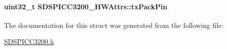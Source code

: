\paragraph[{tx\+Pack\+Pin}]{\setlength{\rightskip}{0pt plus 5cm}uint32\+\_\+t S\+D\+S\+P\+I\+C\+C3200\+\_\+\+H\+W\+Attrs\+::tx\+Pack\+Pin}\label{struct_s_d_s_p_i_c_c3200___h_w_attrs_ac74ef997109f15ab77d18fac98bbf939}


The documentation for this struct was generated from the following file\+:\begin{DoxyCompactItemize}
\item 
\hyperlink{_s_d_s_p_i_c_c3200_8h}{S\+D\+S\+P\+I\+C\+C3200.\+h}\end{DoxyCompactItemize}
